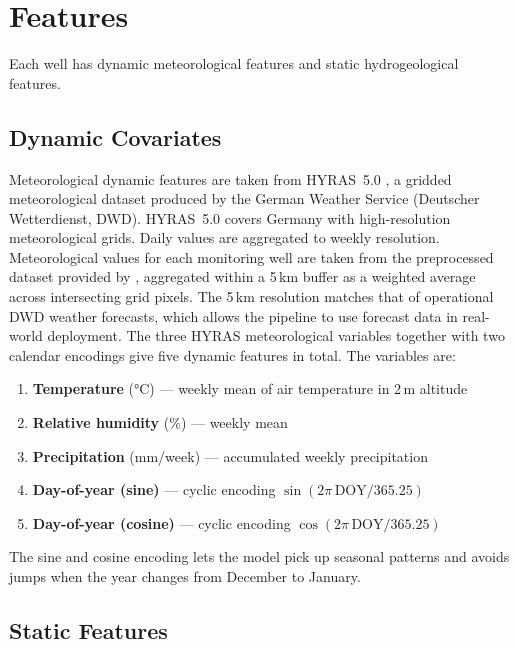 \section{Features}
\label{sec:features}

Each well has dynamic meteorological features and static hydrogeological features.

\subsection{Dynamic Covariates}

Meteorological dynamic features are taken from HYRAS~5.0 \citep{razafimaharo2020}, a
gridded meteorological dataset produced by the German Weather Service (Deutscher
Wetterdienst, DWD). HYRAS~5.0 covers Germany with high-resolution meteorological grids. Daily
values are aggregated to weekly resolution. Meteorological values for each monitoring well are taken from the preprocessed dataset provided
by \citet{kunz2025}, aggregated within a 5\,km buffer as a weighted average across intersecting
grid pixels. The 5\,km resolution matches that of operational DWD weather forecasts, which allows
the pipeline to use forecast data in real-world deployment. The three HYRAS meteorological
variables together with two calendar encodings give five dynamic features in total. The
variables are:

\begin{enumerate}
  \item \textbf{Temperature} (°C) --- weekly mean of air temperature in 2\,m altitude
  \item \textbf{Relative humidity} (\%) --- weekly mean
  \item \textbf{Precipitation} (mm/week) --- accumulated weekly precipitation
  \item \textbf{Day-of-year (sine)} --- cyclic encoding $\sin(2\pi\,\text{DOY}/365.25)$
  \item \textbf{Day-of-year (cosine)} --- cyclic encoding $\cos(2\pi\,\text{DOY}/365.25)$
\end{enumerate}

The sine and cosine encoding lets the model pick up seasonal patterns and avoids jumps
when the year changes from December to January.

\subsection{Static Features}
\label{sec:static_features}

